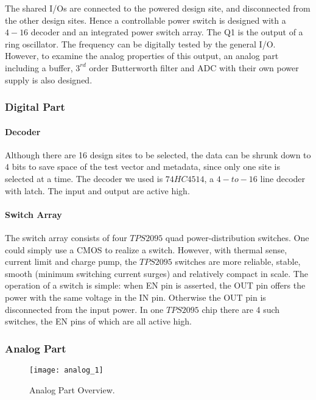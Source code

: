 The shared I/Os are connected to the powered design site, and disconnected from the other design sites. Hence a controllable power switch is designed with a $4-16$ decoder and an integrated power switch array. The Q1 is the output of a ring oscillator. The frequency can be digitally tested by the general I/O. However, to examine the analog properties of this output, an analog part including a buffer, $3^{rd}$ order Butterworth filter and ADC with their own power supply is also designed.


\subsubsection{Digital Part}

\paragraph{Decoder}

Although there are 16 design sites to be selected, the data can be shrunk down to $4$ bits to save space of the test vector and metadata, since only one site is selected at a time. The decoder we used is $74HC4514$, a $4-to-16$ line decoder with latch. The input and output are active high.

\paragraph{Switch Array}

The switch array consists of four $TPS2095$ quad power-distribution switches. One could simply use a CMOS to realize a switch. However, with thermal sense, current limit and charge pump, the $TPS2095$ switches are more reliable, stable, smooth (minimum switching current surges) and relatively compact in scale. The operation of a switch is simple: when EN pin is asserted, the OUT pin offers the power with the same voltage in the IN pin. Otherwise the OUT pin is disconnected from the input power. In one $TPS2095$ chip there are 4 such switches, the EN pins of which are all active high.


\subsubsection{Analog Part}

\begin{figure}
 \centering
 \texttt{[image: analog\_1]}
 \caption{Analog Part Overview.}
 \label{fig:analog_overview}
\end{figure}

